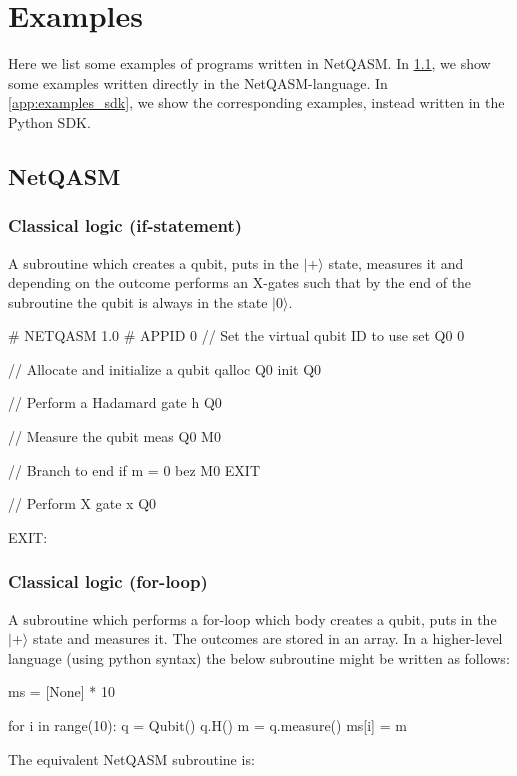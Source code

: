 \section{Examples}
Here we list some examples of programs written in \ac{NetQASM}.
In \cref{sec:examples_netqasm}, we show some examples written directly in the \ac{NetQASM}-language.
In \cref{app:examples_sdk}, we show the corresponding examples, instead written in the Python SDK.

\subsection{NetQASM}
\label{sec:examples_netqasm}

\subsubsection{Classical logic (if-statement)}
\label{sec:example_nq_if}
A subroutine which creates a qubit, puts in the $|+\rangle$ state, measures it and depending on the outcome performs an X-gates such that by the end of the subroutine the qubit is always in the state $|0\rangle$.
\begin{nqcode}
# NETQASM 1.0
# APPID 0
// Set the virtual qubit ID to use
set Q0 0

// Allocate and initialize a qubit
qalloc Q0
init Q0

// Perform a Hadamard gate
h Q0

// Measure the qubit
meas Q0 M0

// Branch to end if m = 0
bez M0 EXIT

// Perform X gate
x Q0

EXIT:\end{nqcode}

\subsubsection{Classical logic (for-loop)}
\label{sec:example_nq_for}
A subroutine which performs a for-loop which body creates a qubit, puts in the $|+\rangle$ state and measures it. The outcomes are stored in an array.
In a higher-level language (using python syntax) the below subroutine might be written as follows:
\begin{pycode}
ms = [None] * 10

for i in range(10):
  q = Qubit()
  q.H()
  m = q.measure()
  ms[i] = m
\end{pycode}
The equivalent \ac{NetQASM} subroutine is:

